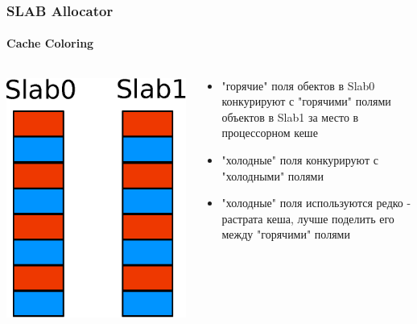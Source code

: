 \begin{frame}
\frametitle{SLAB Allocator}
\framesubtitle{Cache Coloring}

\begin{columns}[T]

  \begin{column}{.3\textwidth}
    \includegraphics[width=\linewidth]{slab-color0}
  \end{column}

  \begin{column}{.7\textwidth}
    \begin{itemize}
      \item "горячие" поля обектов в Slab0 конкурируют с "горячими" полями объектов в Slab1 за место в процессорном кеше
      \item "холодные" поля конкурируют с "холодными" полями
      \item "холодные" поля используются редко - растрата кеша, лучше поделить его между "горячими" полями
    \end{itemize}
  \end{column}

\end{columns}

\end{frame}

